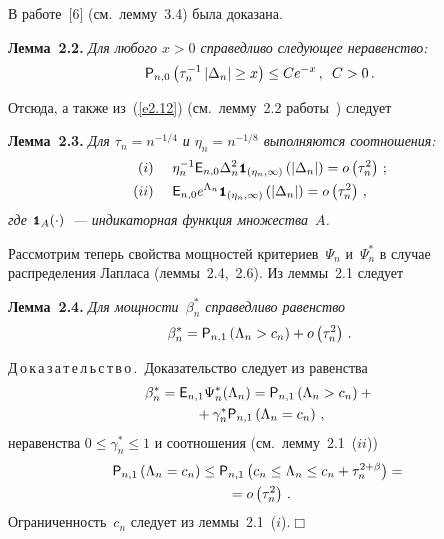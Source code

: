 \begin{multicols}{2}

В работе~[6] (см.\ лемму~3.4) была доказана.

\smallskip

\noindent
\textbf{Лемма~2.2.} {\it Для любого $x>0$ справедливо следующее неравенство:
$$
{{\sf P}}_{n,0}\left( \tau_n^{-1} \left|\Delta_n\right| \geq x \right)\leq Ce^{-x}\,,\enskip C>0\,.
$$
 }

Отсюда, а также из~(\ref{e2.12}) (см.\ лемму~2.2 работы~\cite{5ben}) следует

\smallskip

\noindent
\textbf{Лемма~2.3.} {\it Для $\tau_n=n^{-1/4}$ и $\eta_n=n^{-1/8}$ выполняются соотношения:
\begin{align*}
(i)\ \ \ \ & \eta_n^{-1}{\e}_{n,0}\Delta_n^2 {\Ik}_{\left(\eta_n,\infty\right)}\left(|\Delta_n|\right)= o\left(\tau_n^2\right)\,;
\\
(ii)\ \ \ \  &{\e}_{n,0}e^{\Lambda_n}{\Ik}_{\left(\eta_n,\infty\right)}\left(|\Delta_n|\right)= o\left(\tau_n^2\right)\,,
\end{align*}
где ${\mbox{{\small \tt {1}}\hspace{-1.5mm}{\tt 1}}}_{A}(\cdot)$~--- индикаторная функция множества~$A$. 
}

\smallskip

Рассмотрим теперь свойства мощностей критериев~$\Psi_n$ и~$\Psi_n^*$ в случае распределения Лапласа 
(леммы~2.4,~2.6). Из леммы~2.1 следует


\smallskip

\noindent
\textbf{Лемма~2.4.} {\it Для мощности~$\beta_n^*$ справедливо равенство
$$
\beta_n^*={{\sf P}}_{n,1}\left(\Lambda_n > c_n \right)+ o\left(\tau_n^2\right)\,.
$$
}



\noindent
Д\,о\,к\,а\,з\,а\,т\,е\,л\,ь\,с\,т\,в\,о\,.\
Доказательство следует из равенства
\begin{multline*}
\beta_n^*={{\sf E}}_{n,1}\Psi_n^*(\Lambda_n)={{\sf P}}_{n,1}\left(\Lambda_n > c_n \right)+{}\\
{}+
\gamma_n^*{{\sf P}}_{n,1}\left(\Lambda_n = c_n \right)\,,
\end{multline*}
неравенства $0\leq\gamma_n^*\leq1$ и соотношения (см.\ лемму~2.1~($ii$))
\begin{multline*}
{{\sf P}}_{n,1}\left(\Lambda_n = c_n \right)\leq
{{\sf P}}_{n,1}\left(c_n\leq \Lambda_n \leq c_n + \tau_n^{2+\beta} \right)={}\\
{}= o\left(\tau_n^2\right)\,.
\end{multline*}
Ограниченность~$c_n$ следует из леммы~2.1~($i$).\hfill$\Box$


\end{multicols}
